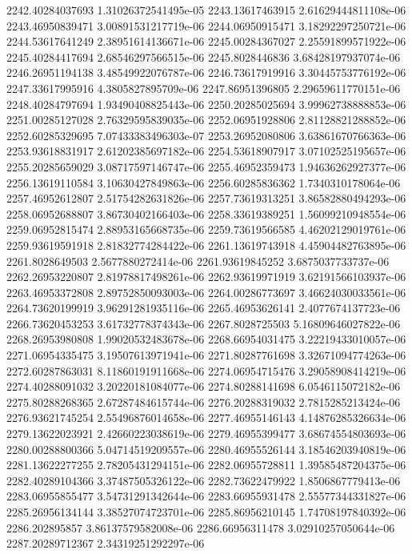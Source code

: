 {2242.40284037693 1.31026372541495e-05
2243.13617463915 2.61629444811108e-06
2243.46950839471 3.00891531217719e-06
2244.06950915471 3.18292297250721e-06
2244.53617641249 2.38951614136671e-06
2245.00284367027 2.25591899571922e-06
2245.40284417694 2.68546297566515e-06
2245.8028446836 3.68428197937074e-06
2246.26951194138 3.48549922076787e-06
2246.73617919916 3.30445753776192e-06
2247.33617995916 4.3805827895709e-06
2247.86951396805 2.29659611770151e-06
2248.40284797694 1.93490408825443e-06
2250.20285025694 3.99962738888853e-06
2251.00285127028 2.76329595839035e-06
2252.06951928806 2.81128821288852e-06
2252.60285329695 7.07433383496303e-07
2253.26952080806 3.63861670766363e-06
2253.93618831917 2.61202385697182e-06
2254.53618907917 3.07102525195657e-06
2255.20285659029 3.08717597146747e-06
2255.46952359473 1.94636262927377e-06
2256.13619110584 3.10630427849863e-06
2256.60285836362 1.7340310178064e-06
2257.46952612807 2.51754282631826e-06
2257.73619313251 3.86582880494293e-06
2258.06952688807 3.86730402166403e-06
2258.33619389251 1.56099210948554e-06
2259.06952815474 2.88953165668735e-06
2259.73619566585 4.46202129019761e-06
2259.93619591918 2.81832774284422e-06
2261.13619743918 4.45904482763895e-06
2261.8028649503 2.5677880272414e-06
2261.93619845252 3.6875037733737e-06
2262.26953220807 2.81978817498261e-06
2262.93619971919 3.62191566103937e-06
2263.46953372808 2.89752850093003e-06
2264.00286773697 3.46624030033561e-06
2264.73620199919 3.96291281935116e-06
2265.46953626141 2.4077674137723e-06
2266.73620453253 3.61732778374343e-06
2267.8028725503 5.16809646027822e-06
2268.26953980808 1.99020532483678e-06
2268.66954031475 3.22219433010057e-06
2271.06954335475 3.19507613971941e-06
2271.80287761698 3.32671094774263e-06
2272.60287863031 8.11860191911668e-06
2274.06954715476 3.29058908414219e-06
2274.40288091032 3.20220181084077e-06
2274.80288141698 6.0546115072182e-06
2275.80288268365 2.67287484615744e-06
2276.20288319032 2.7815285213424e-06
2276.93621745254 2.55496876014658e-06
2277.46955146143 4.14876285326634e-06
2279.13622023921 2.42660223038619e-06
2279.46955399477 3.68674554803693e-06
2280.00288800366 5.04714519209557e-06
2280.46955526144 3.18546203940819e-06
2281.13622277255 2.78205431294151e-06
2282.06955728811 1.39585487204375e-06
2282.40289104366 3.37487505326122e-06
2282.73622479922 1.8506867779413e-06
2283.06955855477 3.54731291342644e-06
2283.66955931478 2.55577344331827e-06
2285.26956134144 3.38527074723701e-06
2285.86956210145 1.74708197840392e-06
2286.202895857 3.86137579582008e-06
2286.66956311478 3.02910257050644e-06
2287.20289712367 2.34319251292297e-06
}
